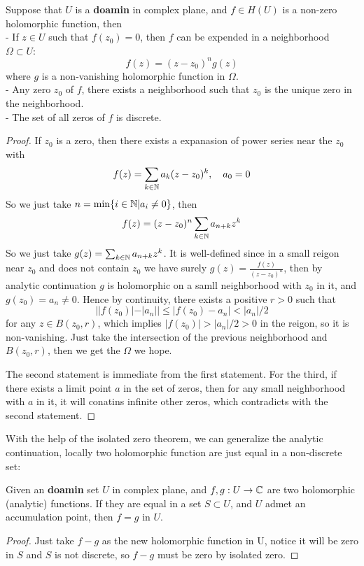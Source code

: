 \documentclass[12pt,a4paper]{article}
\begin{document}
\begin{theorem}
        Suppose that \(U\) is a \textbf{doamin} in complex plane, and \(f \in H(U)\) is a non-zero holomorphic function, then\\
        - If \(z \in U\) such that \(f(z_0) = 0\), then \(f\) can be expended in a neighborhood \(\Omega \subset U\):
        \[f(z) = (z-z_0)^ng(z)\]
        where \(g\) is a non-vanishing holomorphic function in \(\Omega\). \\
        - Any zero \(z_0\) of \(f\), there exists a neighborhood such that \(z_0\) is the unique zero in the neighborhood. \\
        - The set of all zeros of \(f\) is discrete.

    \begin{proof}
            If \(z_0\) is a zero, then there exists a expanasion of power series near the \(z_0\) with 
            \[f(z) = \sum_{k \in \mathbb{N}}a_k(z-z_0)^k, \quad a_0 =0\]
            So we just take \(n = \min\{i \in \mathbb{N}| a_i \neq 0\}\), then 
            \[f(z) = (z-z_0)^n\sum_{k \in \mathbb{N}}a_{n+k}z^k\]
            So we just take \(g(z) = \sum_{k \in \mathbb{N}}a_{n+k}z^k\). It is well-defined since in a small reigon near \(z_0\) and does not contain \(z_0\) we have surely \(g(z) = \frac{f(z)}{(z-z_0)^n}\), then by analytic continuation \(g\) is holomorphic on a samll neighborhood with \(z_0\) in it, and \(g(z_0) = a_n \neq 0\). Hence by continuity, there exists a positive \(r>0\) such that 
            \[||f(z_0)|-|a_n|| \leq |f(z_0)-a_n| < |a_n| /2\]
            for any \(z \in B(z_0,r)\), which implies \(|f(z_0)| > |a_n|/2 > 0\) in the reigon, so it is non-vanishing. Just take the intersection of the previous neighborhood and \(B(z_0,r)\), then we get the \(\Omega\) we hope.

            The second statement is immediate from the first statement. For the third, if there exists a limit point \(a\) in the set of zeros, then for any small neighborhood with \(a\) in it, it will conatins infinite other zeros, which contradicts with the second statement.
    \end{proof}
\end{theorem}

    With the help of the isolated zero theorem, we can generalize the analytic continuation, locally two holomorphic function are just equal in a non-discrete set:

    \begin{theorem}
        Given an \textbf{doamin} set \(U\) in complex plane, and \(f,g: U \to \mathbb{C}\) are two holomorphic (analytic) functions. If they are equal in a set \(S \subset U\), and \(U\) admet an accumulation point, then \(f=g\) in \(U\).

        \begin{proof}
            Just take \(f-g\) as the new holomorphic function in U, notice it will be zero in \(S\) and \(S\) is not discrete, so \(f-g\) must be zero by isolated zero.
        \end{proof}
    \end{theorem}
\end{document}
